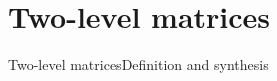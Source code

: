 {
\def\C#1{\makebox[1.5ex]{\hss #1\hss}}
\def\CN{\C{$1$}}
\def\CZ{\C{$0$}}
\def\CI{\textcolor<3-8>{\RCone}{\C{$0$}}}
\def\CII{\alt<5->{\C{\CFCirc{\RCone}}}{\textcolor<3->{\RCone}{\C{$1$}}}}
\def\CJ{\textcolor<4-8>{\RCtwo}{\C{$0$}}}
\def\CJJ{\alt<8->{\C{\CFCirc{\RCtwo}}}{\textcolor<4->{\RCtwo}{\C{$1$}}}}
\def\CIJ{\alt<6->{\C{\CFCirc{\RCthree}}}{\alt<1-2>{\C{$0$}}{\alt<3>{\ColorOne{\C{$0$}}}{\ColorFive{\C{$0$}}}}}}
\def\CJI{\alt<7->{\C{\CFCirc{\RCfour}}}{\alt<1-2>{\C{$0$}}{\alt<3>{\ColorOne{\C{$0$}}}{\ColorFive{\C{$0$}}}}}}
\def\MA{\ColorTwo{\ensuremath{-a}}}
\def\MAC{\ColorTwo{\ensuremath{\Conj{-a}}}}
\def\A{\ColorOne{\ensuremath{a}}}
\def\AC{\ColorOne{\ensuremath{\Conj{a}}}}
\def\BC{\ColorThree{\ensuremath{\Conj{b}}}}
\def\BCUnconj{\ColorThree{\ensuremath{b}}}
\def\B{\ColorFour{\ensuremath{b}}}
\def\BConj{\ColorFour{\ensuremath{\Conj{b}}}}

\section{Two-level matrices}
\begin{frame}{Two-level matrices}{Definition and synthesis}


\end{frame}}
